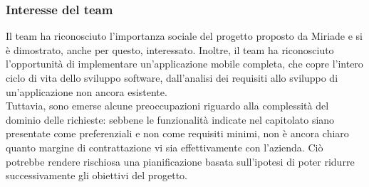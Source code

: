 \documentclass[a4paper,11pt]{article}
\begin{document}
\subsubsection{Interesse del team}
\parbox[t]{\linewidth}{%
Il team ha riconosciuto l'importanza sociale del progetto proposto da Miriade e si è dimostrato, anche per questo, interessato.
Inoltre, il team ha riconosciuto l'opportunità di implementare un'applicazione mobile completa, che copre l'intero ciclo di vita dello sviluppo software, dall'analisi dei requisiti allo sviluppo di un'applicazione non ancora esistente.
\\Tuttavia, sono emerse alcune preoccupazioni riguardo alla complessità del dominio delle richieste: sebbene le funzionalità indicate nel capitolato siano presentate come preferenziali e non come requisiti minimi, non è ancora chiaro quanto margine di contrattazione vi sia effettivamente con l'azienda. Ciò potrebbe rendere rischiosa una pianificazione basata sull'ipotesi di poter ridurre successivamente gli obiettivi del progetto.}
\end{document}
